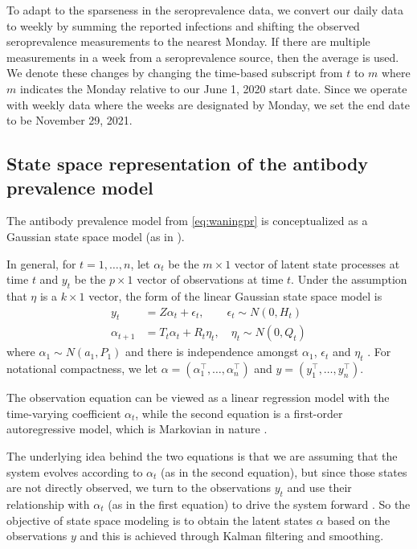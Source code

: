 To adapt to the sparseness in the seroprevalence data, we convert our daily data
to weekly by summing the reported infections and shifting the observed
seroprevalence measurements to the nearest Monday. If there are multiple
measurements in a week from a seroprevalence source, then the average is used.
We denote these changes by changing the time-based subscript from $t$ to $m$
where $m$ indicates the Monday relative to our June 1, 2020 start date.
Since we operate with weekly data where the weeks are designated by Monday, we set the 
end date to be November 29, 2021. 

\subsection{State space representation of the antibody prevalence model}\label{supp:ssapm} 

The antibody prevalence model from \autoref{eq:waningpr} is conceptualized
as a Gaussian state space model (as in \citealp{durbin2012time, helske2017kfas}).

In general, for $t = 1, \dots, n$, let $\alpha_t$ be the $m \times 1$ vector of
latent state processes at time $t$ and $y_t$ be the $p \times 1$ vector of
observations at time $t$. Under the assumption that $\eta$ is a $k \times 1$
vector, the form of the linear Gaussian state space model is 
\begin{align}
y_t &= Z\alpha_t + \epsilon_t, \qquad \epsilon_t \sim N(0, H_t) \label{eq:ss1}\\
\alpha_{t+1} &= T_t\alpha_t + R_t\eta_t, \quad \eta_t \sim N(0, Q_t) \label{eq:ss2}
\end{align}
where $\alpha_1 \sim N(a_1, P_1)$ and 
there is independence amongst $\alpha_1$, $\epsilon_t$ and $\eta_t$
\citep{helske2017kfas, durbin2012time}. For notational
compactness, we let $\alpha = \left ( \alpha_1^\top, \dots, \alpha_n^\top \right )$
and $y = \left ( y_1^\top, \dots, y_n^\top \right )$.

The observation equation can be viewed as a linear regression model with the
time-varying coefficient $\alpha_t$, while the second equation is a first-order
autoregressive model, which is Markovian in nature \citep{durbin2012time}. 

The underlying idea behind the two equations is that we are assuming that the
system evolves according to $\alpha_t$ (as in the second equation), but since
those states are not directly observed, we turn to the observations $y_t$ and
use their relationship with $\alpha_t$ (as in the first equation) to drive the
system forward \citep{durbin2012time}. So the objective of state space modeling
is to obtain the latent states $\alpha$ based on the observations $y$ and this
is achieved through Kalman filtering and smoothing. 

